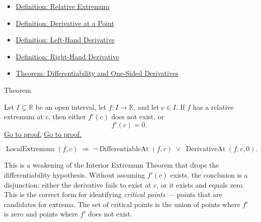 \begin{remark*}[Dependencies]
\begin{itemize}
  \item \hyperref[def:relative-extremum]{Definition: Relative Extremum}
  \item \hyperref[def:derivative-at-a-point]{Definition: Derivative at a Point}
  \item \hyperref[def:left-hand-derivative]{Definition: Left-Hand Derivative}
  \item \hyperref[def:right-hand-derivative]{Definition: Right-Hand Derivative}
  \item \hyperref[thm:differentiability-and-one-sided-derivatives]{Theorem: Differentiability and One-Sided Derivatives}
\end{itemize}
\end{remark*}


\begin{theorembox}{Theorem}
\begin{theorem}
\label{thm:necessary-condition-extremum}
Let $I \subseteq \mathbb{R}$ be an open interval, let $f : I \to \mathbb{R}$, and let $c \in I$. If $f$ has a relative extremum at $c$, then either $f'(c)$ does not exist, or
\[
f'(c) = 0.
\]
\hyperref[prf:relative-extremum-derivatives-equal-0-or-dont-exist]{Go to proof.}
\hyperref[prf:necessary-condition-extremum]{Go to proof.}
\end{theorem}
\end{theorembox}

\begin{remark*}
\[
\operatorname{LocalExtremum}(f,c)
\;\Rightarrow\;
\lnot\operatorname{DifferentiableAt}(f,c) \;\lor\; \operatorname{DerivativeAt}(f,c,0).
\]
\end{remark*}

\begin{remark*}[Interpretation]
This is a weakening of the Interior Extremum Theorem that drops the differentiability hypothesis. Without assuming $f'(c)$ exists, the conclusion is a disjunction: either the derivative fails to exist at $c$, or it exists and equals zero. This is the correct form for identifying \emph{critical points} --- points that are candidates for extrema. The set of critical points is the union of points where $f'$ is zero and points where $f'$ does not exist.
\end{remark*}

